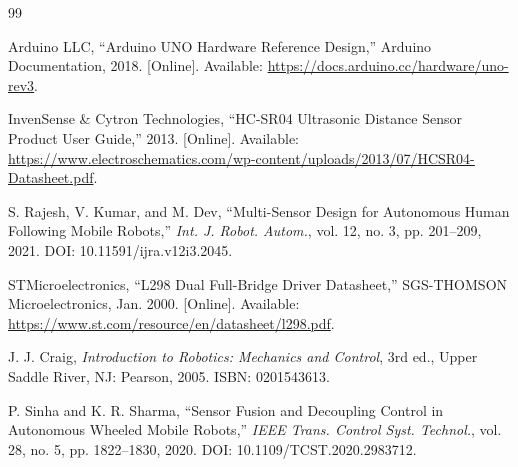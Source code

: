 \documentclass[12pt,a4paper,oneside]{report}
\begin{document}
\begin{singlespace}
\begin{thebibliography}{99}
\fontsize{10}{12}\selectfont
\setlength{\itemsep}{4pt}
\setlength{\parsep}{0pt}

Arduino LLC, ``Arduino UNO Hardware Reference Design,'' Arduino Documentation, 2018. [Online]. Available: \url{https://docs.arduino.cc/hardware/uno-rev3}.

InvenSense \& Cytron Technologies, ``HC-SR04 Ultrasonic Distance Sensor Product User Guide,'' 2013. [Online]. Available: \url{https://www.electroschematics.com/wp-content/uploads/2013/07/HCSR04-Datasheet.pdf}.

S. Rajesh, V. Kumar, and M. Dev, ``Multi-Sensor Design for Autonomous Human Following Mobile Robots,'' \textit{Int. J. Robot. Autom.}, vol. 12, no. 3, pp. 201--209, 2021. DOI: 10.11591/ijra.v12i3.2045.

STMicroelectronics, ``L298 Dual Full-Bridge Driver Datasheet,'' SGS-THOMSON Microelectronics, Jan. 2000. [Online]. Available: \url{https://www.st.com/resource/en/datasheet/l298.pdf}.

J. J. Craig, \textit{Introduction to Robotics: Mechanics and Control}, 3rd ed., Upper Saddle River, NJ: Pearson, 2005. ISBN: 0201543613.

P. Sinha and K. R. Sharma, ``Sensor Fusion and Decoupling Control in Autonomous Wheeled Mobile Robots,'' \textit{IEEE Trans. Control Syst. Technol.}, vol. 28, no. 5, pp. 1822--1830, 2020. DOI: 10.1109/TCST.2020.2983712.

\end{thebibliography}
\end{singlespace}
\end{document}
